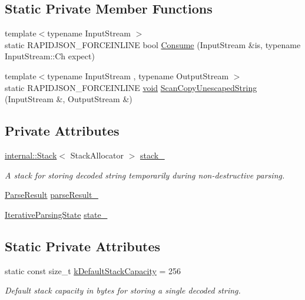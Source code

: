 \subsection*{Static Private Member Functions}
\begin{DoxyCompactItemize}
\item 
{\footnotesize template$<$typename Input\+Stream $>$ }\\static R\+A\+P\+I\+D\+J\+S\+O\+N\+\_\+\+F\+O\+R\+C\+E\+I\+N\+L\+I\+NE bool \hyperlink{classGenericReader_a5552ffdca0c3872ffeab6d35ea7038c2}{Consume} (Input\+Stream \&is, typename Input\+Stream\+::\+Ch expect)
\item 
{\footnotesize template$<$typename Input\+Stream , typename Output\+Stream $>$ }\\static R\+A\+P\+I\+D\+J\+S\+O\+N\+\_\+\+F\+O\+R\+C\+E\+I\+N\+L\+I\+NE \hyperlink{imgui__impl__opengl3__loader_8h_ac668e7cffd9e2e9cfee428b9b2f34fa7}{void} \hyperlink{classGenericReader_a22d69758dcadf454e372226be028483c}{Scan\+Copy\+Unescaped\+String} (Input\+Stream \&, Output\+Stream \&)
\end{DoxyCompactItemize}
\subsection*{Private Attributes}
\begin{DoxyCompactItemize}
\item 
\hyperlink{classinternal_1_1Stack}{internal\+::\+Stack}$<$ Stack\+Allocator $>$ \hyperlink{classGenericReader_a7c04f4aa27561d358376920d06b78cdb}{stack\+\_\+}
\begin{DoxyCompactList}\small\item\em A stack for storing decoded string temporarily during non-\/destructive parsing. \end{DoxyCompactList}\item 
\hyperlink{structParseResult}{Parse\+Result} \hyperlink{classGenericReader_a156018c2805bfa730287314ee9d9257d}{parse\+Result\+\_\+}
\item 
\hyperlink{classGenericReader_a269700a68b925db2f3ecc84b75f2277e}{Iterative\+Parsing\+State} \hyperlink{classGenericReader_ae155ea97ca78d4ee6c8d848b5b1da3dc}{state\+\_\+}
\end{DoxyCompactItemize}
\subsection*{Static Private Attributes}
\begin{DoxyCompactItemize}
\item 
static const size\+\_\+t \hyperlink{classGenericReader_ac507ea8672bf2b5d01b35583c0597f15}{k\+Default\+Stack\+Capacity} = 256
\begin{DoxyCompactList}\small\item\em Default stack capacity in bytes for storing a single decoded string. \end{DoxyCompactList}\end{DoxyCompactItemize}


